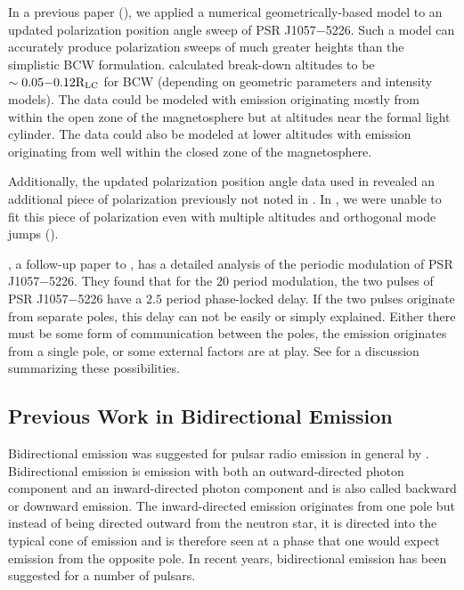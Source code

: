 In a previous paper (\citealp{craig2014tackling}), we applied 
a numerical geometrically-based model to an updated polarization
position angle sweep of PSR J1057$-$5226. 
Such a model 
can accurately produce polarization sweeps of much greater
heights  than the
simplistic BCW formulation. \cite{craig2012altitude}
calculated break-down altitudes to be $\sim0.05\rm{-}0.12R_{\rm{LC}}$
for BCW (depending on geometric parameters and intensity models).
The data could be modeled with emission originating mostly 
from within the open zone of the magnetosphere but at
altitudes near the formal light cylinder.  The data could
also be modeled at lower altitudes with emission originating
from well within the closed zone of the magnetosphere.

Additionally, the updated polarization position angle data used in \cite{craig2014tackling}
revealed an additional piece of polarization previously not noted in \cite{weltevrede2009mapping}.
In \cite{craig2014tackling}, we were unable to fit this piece of polarization even 
with multiple altitudes and orthogonal mode jumps (\citealp{backer1976orthogonal}).  

\cite{weltevrede2012phase}, a follow-up paper to \cite{weltevrede2009mapping}, has a 
detailed analysis of the periodic modulation of PSR J1057$-$5226. 
They found that for the $20$ period modulation, the two pulses of PSR J1057$-$5226 have a $2.5$ period phase-locked delay.
If the two pulses originate from separate poles, this delay can not be easily or simply 
explained.  Either there must be some form of communication between the poles, the emission originates
from a single pole, or some external factors are at play.
See \cite{weltevrede2012phase} for a discussion summarizing these possibilities.  


\subsection{Previous Work in Bidirectional Emission}
\label{sec:previousBidirectional}

Bidirectional emission was suggested
for pulsar radio emission in general by \cite{dyks2005reversals}.
Bidirectional emission is emission with both an outward-directed photon component
and an inward-directed photon component and is 
also called
backward or downward emission.
The inward-directed emission originates from
one pole but instead of being directed outward from the neutron star,
it is directed into the typical cone of emission and is therefore seen
at a phase that one would expect emission from the opposite
pole.  
In recent years, bidirectional emission has been suggested for 
a number of pulsars.

